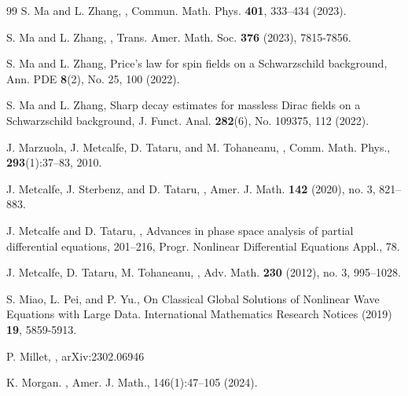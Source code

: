 \documentclass[10pt,a4paper,reqno]{amsart}
\theoremstyle{definition}
\theoremstyle{remark}
\numberwithin{equation}{section}
\begin{document}
\begin{thebibliography}{99}
 S. Ma and L. Zhang,
,
\newblock Commun. Math. Phys. \textbf{401}, 333–434 (2023). 

 S. Ma and L. Zhang,
,
\newblock Trans. Amer. Math. Soc. \textbf{376} (2023), 7815-7856.

 S. Ma and L. Zhang,
\newblock Price’s law for spin fields on a Schwarzschild background,
\newblock Ann. PDE \textbf{8}(2), No. 25, 100 (2022).

 S. Ma and L. Zhang,
\newblock Sharp decay estimates for massless Dirac fields on a Schwarzschild background,
\newblock J. Funct. Anal. \textbf{282}(6), No. 109375, 112 (2022).

 J. Marzuola, J. Metcalfe, D. Tataru, and M. Tohaneanu,
,
\newblock Comm. Math. Phys., \textbf{293}(1):37--83, 2010.

 J. Metcalfe, J. Sterbenz, and D. Tataru,
,
\newblock Amer. J. Math. \textbf{142} (2020), no. 3, 821--883.

 J. Metcalfe and D. Tataru,
,
\newblock Advances in phase space analysis of partial differential equations, 201--216, Progr. Nonlinear Differential Equations Appl., 78.


 J. Metcalfe, D. Tataru, M. Tohaneanu, 
,
\newblock Adv. Math. \textbf{230} (2012), no. 3, 995--1028.

S. Miao, L. Pei, and P. Yu.,
\newblock On Classical Global Solutions of Nonlinear Wave Equations with Large Data. 
\newblock International Mathematics Research Notices (2019) \textbf{19}, 5859-5913. 

P. Millet,
,
\newblock arXiv:2302.06946

 K. Morgan. 
,
\newblock Amer. J. Math., 146(1):47–105 (2024).


\end{thebibliography}
\end{document}
